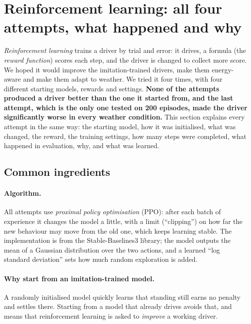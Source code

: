 \section{Reinforcement learning: all four attempts, what happened and why}\label{sec:rl}

\begin{plainwords}
\emph{Reinforcement learning} trains a driver by trial and error: it drives, a formula (the \emph{reward function}) scores each step, and the driver is changed to collect more score. We hoped it would improve the imitation-trained drivers, make them energy-aware and make them adapt to weather. We tried it four times, with four different starting models, rewards and settings.
\textbf{None of the attempts produced a driver better than the one it started from, and the last attempt, which is the only one tested on 200 episodes, made the driver significantly worse in every weather condition.}
This section explains every attempt in the same way: the starting model, how it was initialised, what was changed, the reward, the training settings, how many steps were completed, what happened in evaluation, why, and what was learned.
\end{plainwords}

\subsection{Common ingredients}
\paragraph{Algorithm.} All attempts use \emph{proximal policy optimisation} (PPO): after each batch of experience it changes the model a little, with a limit (``clipping'') on how far the new behaviour may move from the old one, which keeps learning stable. The implementation is from the Stable-Baselines3 library; the model outputs the mean of a Gaussian distribution over the two actions, and a learned ``log standard deviation'' sets how much random exploration is added.
\paragraph{Why start from an imitation-trained model.} A randomly initialised model quickly learns that standing still earns no penalty and settles there. Starting from a model that already drives avoids that, and means that reinforcement learning is asked to \emph{improve} a working driver.
